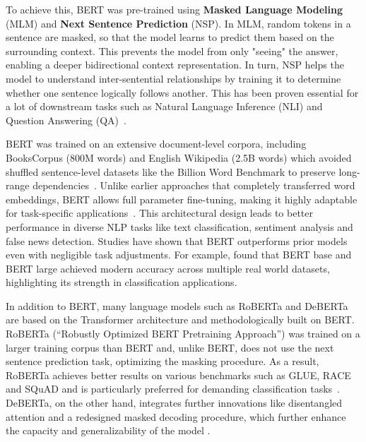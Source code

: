 To achieve this, BERT was pre-trained using \textbf{Masked Language Modeling} (MLM) and \textbf{Next Sentence Prediction} (NSP). In MLM, random tokens in a sentence are masked, so that the model learns to predict them based on the surrounding context. This prevents the model from only "seeing" the answer, enabling a deeper bidirectional context representation. In turn, NSP helps the model to understand inter-sentential relationships by training it to determine whether one sentence logically follows another. \cite{devlin2019bert} This has been proven essential for a lot of downstream tasks such as Natural Language Inference (NLI) and Question Answering (QA)~\parencite{sun2020finetuneberttextclassification}.

BERT was trained on an extensive document-level corpora, including BooksCorpus (800M words) and English Wikipedia (2.5B words) which avoided shuffled sentence-level datasets like the Billion Word Benchmark to preserve long-range dependencies~\parencite{devlin2019bert}. Unlike earlier approaches that completely transferred word embeddings, BERT allows full parameter fine-tuning, making it highly adaptable for task-specific applications~\parencite{korootev2021BERT}. This architectural design leads to better performance in diverse NLP tasks like text classification, sentiment analysis and false news detection. Studies have shown that BERT outperforms prior models even with negligible task adjustments. For example, \textcite{qasim2022fine} found that BERT base and BERT large achieved modern accuracy across multiple real world datasets, highlighting its strength in classification applications.

In addition to BERT, many language models such as RoBERTa \parencite{liu2019roberta} and DeBERTa \parencite{he2021deberta} are based on the Transformer architecture and methodologically built on BERT. RoBERTa (“Robustly Optimized BERT Pretraining Approach”) was trained on a larger training corpus than BERT and, unlike BERT, does not use the next sentence prediction task, optimizing the masking procedure. As a result, RoBERTa achieves better results on various benchmarks such as GLUE, RACE and SQuAD and is particularly preferred for demanding classification tasks~\parencite{liu2019roberta}. DeBERTa, on the other hand, integrates further innovations like disentangled attention and a redesigned masked decoding procedure, which further enhance the capacity and generalizability of the model \cite{he2021deberta, he2023debertav3}.


